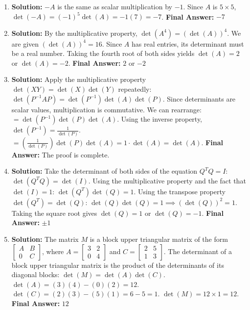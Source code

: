 \documentclass[11pt]{article}
\begin{document}
\begin{enumerate}
    \item \textbf{Solution:} $-A$ is the same as scalar multiplication by $-1$. Since $A$ is $5 \times 5$, $\det(-A) = (-1)^5 \det(A) = -1(7) = -7$.
    \textbf{Final Answer:} $-7$

    \item \textbf{Solution:} By the multiplicative property, $\det(A^4) = (\det(A))^4$.
    We are given $(\det(A))^4 = 16$. Since $A$ has real entries, its determinant must be a real number.
    Taking the fourth root of both sides yields $\det(A) = 2$ or $\det(A) = -2$.
    \textbf{Final Answer:} $2$ or $-2$

    \item \textbf{Solution:} Apply the multiplicative property $\det(XY) = \det(X)\det(Y)$ repeatedly:
    $\det(P^{-1}AP) = \det(P^{-1})\det(A)\det(P)$.
    Since determinants are scalar values, multiplication is commutative. We can rearrange:
    $= \det(P^{-1})\det(P)\det(A)$.
    Using the inverse property, $\det(P^{-1}) = \frac{1}{\det(P)}$.
    $= \left(\frac{1}{\det(P)}\right) \det(P) \det(A) = 1 \cdot \det(A) = \det(A)$.
    \textbf{Final Answer:} The proof is complete.

    \item \textbf{Solution:} Take the determinant of both sides of the equation $Q^T Q = I$:
    $\det(Q^T Q) = \det(I)$.
    Using the multiplicative property and the fact that $\det(I) = 1$:
    $\det(Q^T)\det(Q) = 1$.
    Using the transpose property $\det(Q^T) = \det(Q)$:
    $\det(Q)\det(Q) = 1 \implies (\det(Q))^2 = 1$.
    Taking the square root gives $\det(Q) = 1$ or $\det(Q) = -1$.
    \textbf{Final Answer:} $\pm 1$

    \item \textbf{Solution:} The matrix $M$ is a block upper triangular matrix of the form $\begin{bmatrix} A & B \\ 0 & C \end{bmatrix}$, where $A = \begin{bmatrix} 3 & 2 \\ 0 & 4 \end{bmatrix}$ and $C = \begin{bmatrix} 2 & 5 \\ 1 & 3 \end{bmatrix}$.
    The determinant of a block upper triangular matrix is the product of the determinants of its diagonal blocks: $\det(M) = \det(A)\det(C)$.
    $\det(A) = (3)(4) - (0)(2) = 12$.
    $\det(C) = (2)(3) - (5)(1) = 6 - 5 = 1$.
    $\det(M) = 12 \times 1 = 12$.
    \textbf{Final Answer:} $12$


\end{enumerate}
\end{document}
